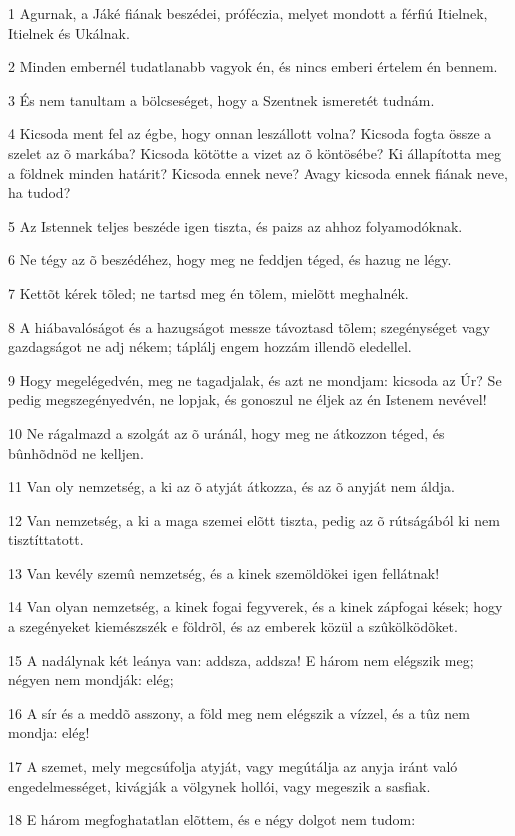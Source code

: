 \par 1 Agurnak, a Jáké fiának beszédei, próféczia, melyet mondott a férfiú Itielnek, Itielnek és Ukálnak.
\par 2 Minden embernél tudatlanabb vagyok én, és nincs emberi értelem én bennem.
\par 3 És nem tanultam a bölcseséget, hogy a Szentnek ismeretét tudnám.
\par 4 Kicsoda ment fel az égbe, hogy onnan leszállott volna? Kicsoda fogta össze a szelet az õ markába? Kicsoda kötötte a vizet az õ köntösébe? Ki állapította meg a földnek minden határit? Kicsoda ennek neve? Avagy kicsoda ennek fiának neve, ha tudod?
\par 5 Az Istennek teljes beszéde igen tiszta, és paizs az ahhoz folyamodóknak.
\par 6 Ne tégy az õ beszédéhez, hogy meg ne feddjen téged, és hazug ne légy.
\par 7 Kettõt kérek tõled; ne tartsd meg én tõlem, mielõtt meghalnék.
\par 8 A hiábavalóságot és a hazugságot messze távoztasd tõlem; szegénységet vagy gazdagságot ne adj nékem; táplálj engem hozzám illendõ eledellel.
\par 9 Hogy megelégedvén, meg ne tagadjalak, és azt ne mondjam: kicsoda az Úr? Se pedig megszegényedvén, ne lopjak, és gonoszul ne éljek az én Istenem nevével!
\par 10 Ne rágalmazd a szolgát az õ uránál, hogy meg ne átkozzon téged, és bûnhõdnöd ne kelljen.
\par 11 Van oly nemzetség, a ki az õ atyját átkozza, és az õ anyját nem áldja.
\par 12 Van nemzetség, a ki a maga szemei elõtt tiszta, pedig az õ rútságából ki nem tisztíttatott.
\par 13 Van kevély szemû nemzetség, és a kinek szemöldökei igen fellátnak!
\par 14 Van olyan nemzetség, a kinek fogai fegyverek, és a kinek zápfogai kések; hogy a szegényeket kiemészszék e földrõl, és az emberek közül a szûkölködõket.
\par 15 A nadálynak két leánya van: addsza, addsza! E három nem elégszik meg; négyen nem mondják: elég;
\par 16 A sír és a meddõ asszony, a föld meg nem elégszik a vízzel, és a tûz nem mondja: elég!
\par 17 A szemet, mely megcsúfolja atyját, vagy megútálja az anyja iránt való engedelmességet, kivágják a völgynek hollói, vagy megeszik a sasfiak.
\par 18 E három megfoghatatlan elõttem, és e négy dolgot nem tudom:
